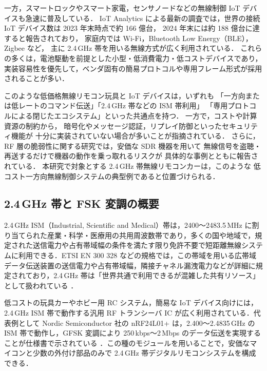 \documentclass[twocolumn,10pt,a4paper]{jsarticle}
\begin{document}
一方，スマートロックやスマート家電，センサノードなどの無線制御 IoT デバイスも急速に普及している．
IoT Analytics による最新の調査では，世界の接続 IoT デバイス数は 2023 年末時点で約 166 億台，
2024 年末には約 188 億台に達すると報告されており\cite{IoTAnalytics2024}，
家庭内では Wi\mbox{-}Fi，Bluetooth Low Energy（BLE），Zigbee など，
主に 2.4\,GHz 帯を用いる無線方式が広く利用されている\cite{ABIWireless2024,BLEMarket2024}．
これらの多くは，電池駆動を前提とした小型・低消費電力・低コストデバイスであり，
実装容易性を優先して，ベンダ固有の簡易プロトコルや専用フレーム形式が採用されることが多い．

このような低価格無線リモコン玩具と IoT デバイスは，いずれも
「一方向または低レートのコマンド伝送」「2.4\,GHz 帯などの ISM 帯利用」
「専用プロトコルによる閉じたエコシステム」といった共通点を持つ．
一方で，コストや計算資源の制約から，
暗号化やメッセージ認証，リプレイ防御といったセキュリティ機能が
十分に実装されていない場合が多いことが指摘されている\cite{Dritsas2025IoTSecurity}．
さらに，RF 層の脆弱性に関する研究では，安価な SDR 機器を用いて
無線信号を盗聴・再送するだけで機器の動作を乗っ取れるリスクが
具体的な事例とともに報告されている\cite{Anthi2024RFVuln}．
本研究で対象とする 2.4\,GHz 帯無線リモコンカーは，このような
低コスト一方向無線制御システムの典型例であると位置づけられる．

\subsection{2.4\,GHz 帯と FSK 変調の概要}

2.4\,GHz ISM（Industrial, Scientific and Medical）帯は，2400～2483.5\,MHz に割り当てられた産業・科学・医療用の共用周波数帯であり，多くの国や地域で，規定された送信電力や占有帯域幅の条件を満たす限り免許不要で短距離無線システムに利用できる．ETSI EN 300 328 などの規格では，この帯域を用いる広帯域データ伝送装置の送信電力や占有帯域幅，隣接チャネル漏洩電力などが詳細に規定されており，2.4\,GHz 帯は「世界共通で利用できるが混雑した共有リソース」として扱われている \cite{EN300328,NXP_Coexistence}．

低コストの玩具カーやホビー用 RC システム，簡易な IoT デバイス向けには，2.4\,GHz ISM 帯で動作する汎用 RF トランシーバ IC が広く利用されている．代表例として Nordic Semiconductor 社の nRF24L01+ は，2.400～2.4835\,GHz の ISM 帯で動作し，GFSK 変調により 250\,kbps～2\,Mbps のデータ伝送を実現することが仕様書で示されている \cite{Nordic_nRF24L01}．この種のモジュールを用いることで，安価なマイコンと少数の外付け部品のみで 2.4\,GHz 帯デジタルリモコンシステムを構成できる．
\end{document}
